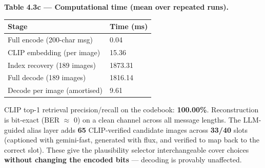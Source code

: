 \documentclass[11pt]{article}
\begin{document}
\textbf{Table 4.3c --- Computational time (mean over repeated runs).}
\begin{table}[H]\centering\small
\begin{tabularx}{\textwidth}{lX}
\toprule
Stage & Time (ms) \\
\midrule
Full encode (200-char msg) & 0.04 \\
CLIP embedding (per image) & 15.36 \\
Index recovery (189 images) & 1873.31 \\
Full decode (189 images) & 1816.14 \\
Decode per image (amortised) & 9.61 \\
\bottomrule
\end{tabularx}
\end{table}
CLIP top-1 retrieval precision/recall on the codebook: \textbf{100.00\%}. Reconstruction is bit-exact (BER $\approx$ 0) on a clean channel across all message lengths.
The LLM-guided alias layer adds \textbf{65} CLIP-verified candidate images across \textbf{33/40} slots (captioned with gemini-fast, generated with flux, and verified to map back to the correct slot). These give the plausibility selector interchangeable cover choices \textbf{without changing the encoded bits} --- decoding is provably unaffected.
\end{document}
